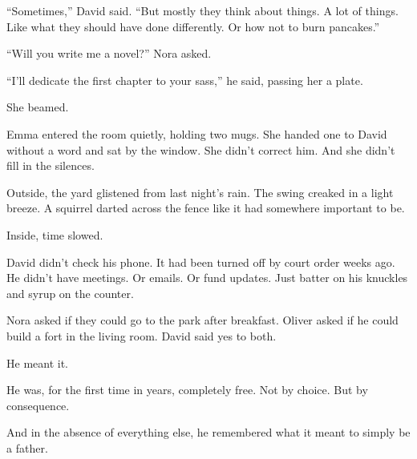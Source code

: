 ``Sometimes,'' David said. ``But mostly they think about things. A lot of things. Like what they should 
have done differently. Or how not to burn pancakes.''

``Will you write me a novel?'' Nora asked.

``I’ll dedicate the first chapter to your sass,'' he said, passing her a plate.

She beamed.

Emma entered the room quietly, holding two mugs. She handed one to David without a word and sat by the 
window. She didn’t correct him. And she didn’t fill in the silences.

Outside, the yard glistened from last night’s rain. The swing creaked in a light breeze. A squirrel 
darted across the fence like it had somewhere important to be.

Inside, time slowed.

David didn’t check his phone. It had been turned off by court order weeks ago.  
He didn’t have meetings. Or emails. Or fund updates.  
Just batter on his knuckles and syrup on the counter.

Nora asked if they could go to the park after breakfast.  
Oliver asked if he could build a fort in the living room.  
David said yes to both.

He meant it.

He was, for the first time in years, completely free.  
Not by choice.  
But by consequence.

And in the absence of everything else,  
he remembered what it meant to simply be a father.

\medskip

